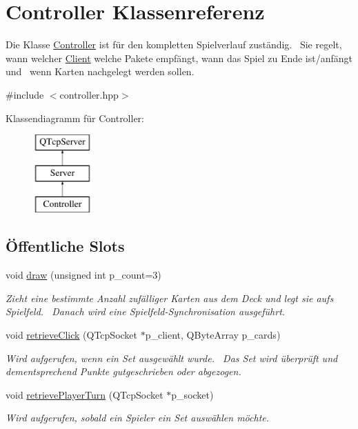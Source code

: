 \hypertarget{class_controller}{}\section{Controller Klassenreferenz}
\label{class_controller}


Die Klasse \hyperlink{class_controller}{Controller} ist für den kompletten Spielverlauf zuständig.~\newline
 Sie regelt, wann welcher \hyperlink{class_client}{Client} welche Pakete empfängt, wann das Spiel zu Ende ist/anfängt und~\newline
 wenn Karten nachgelegt werden sollen.  




{\ttfamily \#include $<$controller.\+hpp$>$}

Klassendiagramm für Controller\+:\begin{figure}[H]
\begin{center}
\leavevmode
\includegraphics[height=3.000000cm]{class_controller}
\end{center}
\end{figure}
\subsection*{Öffentliche Slots}
\begin{DoxyCompactItemize}
\item 
void \hyperlink{class_controller_ad54697994dab06b6340cd674af53f7e2}{draw} (unsigned int p\+\_\+count=3)
\begin{DoxyCompactList}\small\item\em Zieht eine bestimmte Anzahl zufälliger Karten aus dem Deck und legt sie aufs Spielfeld.~\newline
 Danach wird eine Spielfeld-\/\+Synchronisation ausgeführt. \end{DoxyCompactList}\item 
void \hyperlink{class_controller_a0283cf55f555625b3df2cb0b3557d61b}{retrieve\+Click} (Q\+Tcp\+Socket $\ast$p\+\_\+client, Q\+Byte\+Array p\+\_\+cards)
\begin{DoxyCompactList}\small\item\em Wird aufgerufen, wenn ein Set ausgewählt wurde.~\newline
 Das Set wird überprüft und dementsprechend Punkte gutgeschrieben oder abgezogen. \end{DoxyCompactList}\item 
void \hyperlink{class_controller_a74bfe4153a8b5d66621bb19c76767d8c}{retrieve\+Player\+Turn} (Q\+Tcp\+Socket $\ast$p\+\_\+socket)
\begin{DoxyCompactList}\small\item\em Wird aufgerufen, sobald ein Spieler ein Set auswählen möchte. \end{DoxyCompactList}\end{DoxyCompactItemize}
